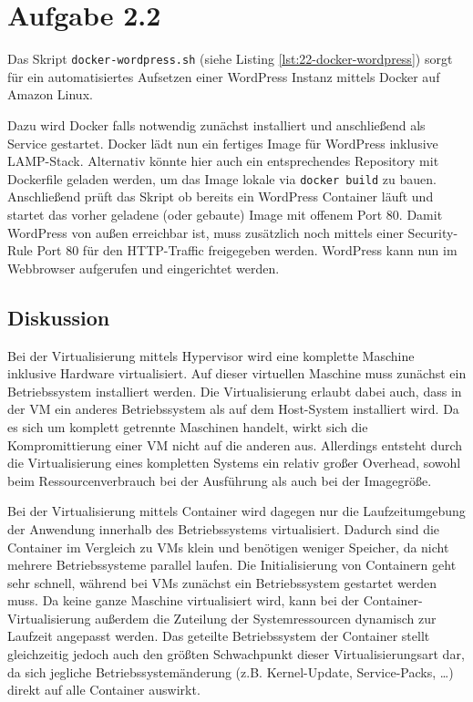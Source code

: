 \documentclass[a4paper]{scrartcl}
\begin{document}
\section*{Aufgabe 2.2}
Das Skript \texttt{docker-wordpress.sh} (siehe Listing \ref{lst:22-docker-wordpress}) sorgt für ein automatisiertes Aufsetzen einer WordPress Instanz mittels Docker auf Amazon Linux.

Dazu wird Docker falls notwendig zunächst installiert und anschließend als Service gestartet. Docker lädt nun ein fertiges Image für WordPress inklusive LAMP-Stack. Alternativ könnte hier auch ein entsprechendes Repository mit Dockerfile geladen werden, um das Image lokale via \verb|docker build| zu bauen. Anschließend prüft das Skript ob bereits ein WordPress Container läuft und startet das vorher geladene (oder gebaute) Image mit offenem Port 80. Damit WordPress von außen erreichbar ist, muss zusätzlich noch mittels einer Security-Rule Port 80 für den HTTP-Traffic freigegeben werden. WordPress kann nun im Webbrowser aufgerufen und eingerichtet werden.

\subsection*{Diskussion}
Bei der Virtualisierung mittels Hypervisor wird eine komplette Maschine inklusive Hardware virtualisiert. Auf dieser virtuellen Maschine muss zunächst ein Betriebssystem installiert werden. Die Virtualisierung erlaubt dabei auch, dass in der VM ein anderes Betriebssystem als auf dem Host-System installiert wird. Da es sich um komplett getrennte Maschinen handelt, wirkt sich die Kompromittierung einer VM nicht auf die anderen aus. Allerdings entsteht durch die Virtualisierung eines kompletten Systems ein relativ großer Overhead, sowohl beim Ressourcenverbrauch bei der Ausführung als auch bei der Imagegröße.

Bei der Virtualisierung mittels Container wird dagegen nur die Laufzeitumgebung der Anwendung innerhalb des Betriebssystems virtualisiert. Dadurch sind die Container im Vergleich zu VMs klein und benötigen weniger Speicher, da nicht mehrere Betriebssysteme parallel laufen. Die Initialisierung von Containern geht sehr schnell, während bei VMs zunächst ein Betriebssystem gestartet werden muss. Da keine ganze Maschine virtualisiert wird, kann bei der Container-Virtualisierung außerdem die Zuteilung der Systemressourcen dynamisch zur Laufzeit angepasst werden. Das geteilte Betriebssystem der Container stellt gleichzeitig jedoch auch den größten Schwachpunkt dieser Virtualisierungsart dar, da sich jegliche Betriebssystemänderung (z.B. Kernel-Update, Service-Packs, \dots) direkt auf alle Container auswirkt.
\end{document}
